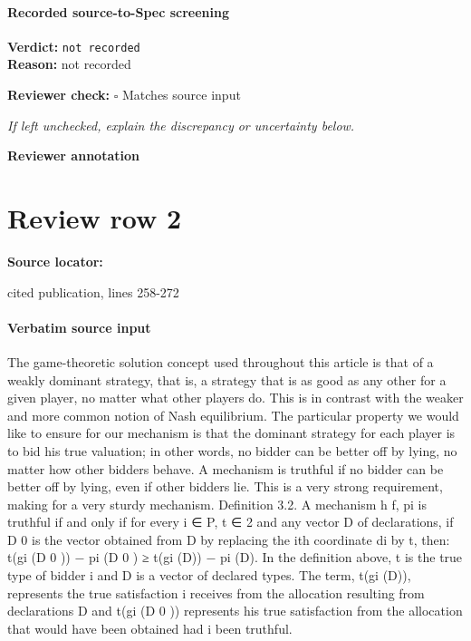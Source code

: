 \documentclass[10pt]{article}
\newcommand{\reviewerbox}{%
  \par\noindent\fbox{\parbox{0.96\linewidth}{\rule{0pt}{0.38in}}}\par
}
\newcommand{\reviewmatch}[1]{%
  \par\noindent\textbf{Reviewer check:} $\square$\; #1\par
  \noindent\emph{If left unchecked, explain the discrepancy or uncertainty below.}\par
}
\begin{document}
\paragraph{Recorded source-to-Spec screening}
\textbf{Verdict:} \texttt{not recorded}
\\
\textbf{Reason:} not recorded
\reviewmatch{Matches source input}
\noindent\textbf{Reviewer annotation}\par
\reviewerbox
\clearpage
\hypertarget{source-claim-c2b89af225180f75}{}
\section*{Review row 2}
\textbf{Source locator:} {\footnotesize\raggedright cited publication, lines 258-\allowbreak{}272\par}
\paragraph{Verbatim source input}
\begin{ReviewVerbatim}
The game-theoretic solution concept used throughout this article is that of a weakly
dominant strategy, that is, a strategy that is as good as any other for a given player,
no matter what other players do. This is in contrast with the weaker and more
common notion of Nash equilibrium. The particular property we would like to
ensure for our mechanism is that the dominant strategy for each player is to bid
his true valuation; in other words, no bidder can be better off by lying, no matter
how other bidders behave. A mechanism is truthful if no bidder can be better off by
lying, even if other bidders lie. This is a very strong requirement, making for a very
sturdy mechanism.
Definition 3.2. A mechanism h f, pi is truthful if and only if for every i ∈ P,
t ∈ 2 and any vector D of declarations, if D 0 is the vector obtained from D by
replacing the ith coordinate di by t, then: t(gi (D 0 )) − pi (D 0 ) ≥ t(gi (D)) − pi (D).
In the definition above, t is the true type of bidder i and D is a vector of declared
types. The term, t(gi (D)), represents the true satisfaction i receives from the allocation resulting from declarations D and t(gi (D 0 )) represents his true satisfaction
from the allocation that would have been obtained had i been truthful.
\end{ReviewVerbatim}
\end{document}
